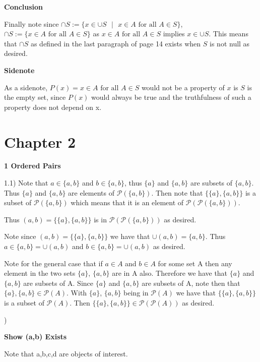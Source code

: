\documentclass{article}
\begin{document}
\medskip
\textbf{Conclusion}
\medskip

Finally note since $\cap S := \{ x \in \cup S \text{ } | \text{ } x \in A \text{ for all } A \in S\}$, $\cap S := \{ x \in A \text{ for all } A \in S\}$ as $x \in A \text{ for all } A \in S$ implies $x \in \cup S$. This means that $\cap S$ as defined in the last paragraph of page 14 exists when $S$ is not null as desired.

\medskip
\textbf{Sidenote}
\medskip

As a sidenote, $P(x) = x \in A \text{ for all } A \in S$ would not be a property of $x$ is $S$ is the empty set, since $P(x)$ would always be true and the truthfulness of such a property does not depend on x.


\bigskip
\section{Chapter 2}
\bigskip

\medskip
\textbf{1 Ordered Pairs}
\medskip

1.1)
\medskip
Note that $a \in \{a,b\}$ and $b \in \{a,b\}$, thus $\{a\}$ and $\{a,b\}$ are subsets of $\{a,b\}$. Thus $\{a\}$ and $\{a,b\}$ are elements of $\mathcal{P}(\{a,b\})$. Then note that $\{\{a\},\{a,b\}\}$ is a subset of $\mathcal{P}(\{a,b\})$ which means that it is an element of $\mathcal{P}(\mathcal{P}(\{a,b\}))$.

\medskip
Thus $(a,b) = \{\{a\},\{a,b\}\}$ is in $\mathcal{P}(\mathcal{P}(\{a,b\}))$ as desired.

\medskip
Note since $(a,b) = \{\{a\},\{a,b\}\}$ we have that $\cup (a,b) = \{a,b\}$. Thus $a \in \{a,b\} = \cup (a,b)$ and $b \in \{a,b\} = \cup (a,b)$ as desired.

\bigskip
Note for the general case that if $a \in A$ and $b \in A$ for some set A then any element in the two sets $\{a\}$, $\{a,b\}$ are in A also. Therefore we have that $\{a\}$ and $\{a,b\}$ are subsets of A. Since $\{a\}$ and $\{a,b\}$ are subsets of A, note then that $\{a\}, \{a,b\} \in \mathcal{P}(A)$. With $\{a\}$, $\{a,b\}$ being in $\mathcal{P}(A)$ we have that $\{\{a\},\{a,b\}\}$ is a subset of $\mathcal{P}(A)$. Then $\{\{a\},\{a,b\}\} \in \mathcal{P}(\mathcal{P}(A))$ as desired. 
 
)

\medskip
\textbf{Show (a,b) Exists}
\medskip

Note that a,b,c,d are objects of interest. 

\medskip
\end{document}
